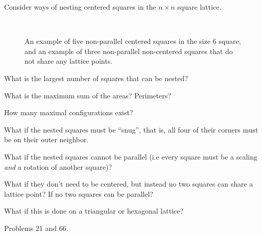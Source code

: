 \documentclass{article}
\begin{document}
  Consider ways of nesting centered squares in the $n \times n$ square lattice.
\begin{figure}[ht!]
  \centering
  ~~~
  \caption{
    An example of five non-parallel centered squares in the size 6 square, and
    an example of three non-parallel non-centered squares that do not share any
    lattice points.
  }
\end{figure}

\begin{question}
  What is the largest number of squares that can be nested?
\end{question}

\begin{related}
  \item What is the maximum sum of the areas? Perimeters?
  \item How many maximal configurations exist?
  \item What if the nested squares must be ``snug'', that is, all four of their
  corners must be on their outer neighbor.
  \item What if the nested squares cannot be parallel
    (i.e every square must be a scaling \textit{and} a rotation of another square)?
  \item What if they don't need to be centered, but instead no two squares can
    share a lattice point? If no two squares can be parallel?
  \item What if this is done on a triangular or hexagonal lattice?
\end{related}

\begin{references}
  \item Problems 21 and 66.
\end{references}
\end{document}
